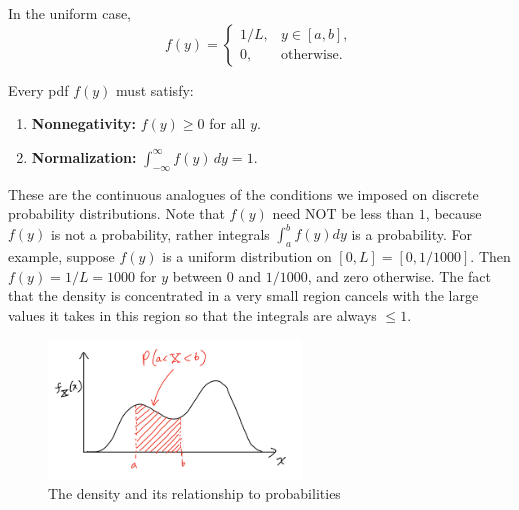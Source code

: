 In the uniform case,  
\[
f(y) = 
\begin{cases}
1/L, & y \in [a,b], \\
0, & \text{otherwise}.
\end{cases}
\]  

Every pdf \(f(y)\) must satisfy:  
\begin{enumerate}
\item \textbf{Nonnegativity:} \(f(y) \ge 0\) for all \(y\).  
\item \textbf{Normalization:} \(\int_{-\infty}^{\infty} f(y)\,dy = 1\).  
\end{enumerate}

These are the continuous analogues of the conditions we imposed on discrete probability distributions.  Note that $f(y)$ need NOT be less than $1$, because $f(y)$ is not a probability, rather integrals $\int_{a}^bf(y)dy$ is a probability. For example, suppose $f(y)$ is a uniform distribution on $[0,L] = [0,1/1000]$. Then $f(y) = 1/L = 1000$ for $y$ between $0$ and $1/1000$, and zero otherwise. The fact that the density is concentrated in a very small region cancels with the large values it takes in this region so that the integrals are always $\le 1$.

\begin{figure}[h]
\centering
\includegraphics[width=0.6\textwidth]{./../figures/density}
\caption{The density and its relationship to probabilities}\label{fig:density}
\end{figure}



